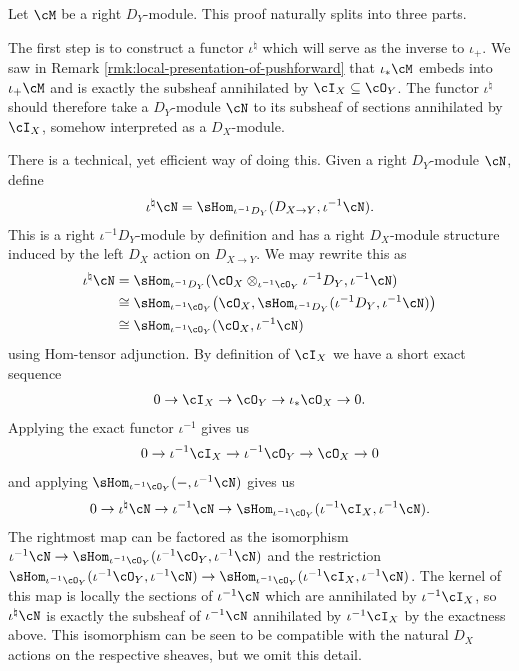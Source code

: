 \begin{prf}
	Let $\cM$ be a right $D_Y$-module. This proof naturally splits into three parts.

	The first step is to construct a functor $\iota^\natural$ which will serve as the inverse to $\iota_+$. We saw in Remark \ref{rmk:local-presentation-of-pushforward} that $\iota_*\cM$ embeds into $\iota_+\cM$ and is exactly the subsheaf annihilated by $\cI_X\subseteq \cO_Y$. The functor $\iota^\natural$ should therefore take a $D_Y$-module $\cN$ to its subsheaf of sections annihilated by $\cI_X$, somehow interpreted as a $D_X$-module.

	There is a technical, yet efficient way of doing this. Given a right $D_Y$-module $\cN$, define
	\begin{align*}
		\iota^\natural\cN = \sHom_{\iota^{-1}D_Y}(D_{X\to Y}, \iota^{-1}\cN).
	\end{align*}
	This is a right $\iota^{-1}D_Y$-module by definition and has a right $D_X$-module structure induced by the left $D_X$ action on $D_{X\to Y}$. We may rewrite this as
	\begin{align*}
		\iota^{\natural}\cN 
		  &= \sHom_{\iota^{-1}D_Y}(\cO_X\otimes_{\iota^{-1}\cO_Y}\iota^{-1}D_Y,\iota^{-1}\cN) \\
		  &\cong \sHom_{\iota^{-1}\cO_Y}\big(\cO_X,\sHom_{\iota^{-1}D_Y}(\iota^{-1}D_Y,\iota^{-1}\cN)\big) \\
		  &\cong \sHom_{\iota^{-1}\cO_Y}(\cO_X,\iota^{-1}\cN)
	\end{align*}
	using Hom-tensor adjunction. By definition of $\cI_X$ we have a short exact sequence
	\begin{align*}
		0\to \cI_X \to \cO_Y \to \iota_*\cO_X\to 0.
	\end{align*}
	Applying the exact functor $\iota^{-1}$ gives us
	\begin{align*}
		0\to \iota^{-1}\cI_X \to \iota^{-1}\cO_Y \to \cO_X \to 0
	\end{align*}
	and applying $\sHom_{\iota^{-1}\cO_Y}(-,\iota^{-1}\cN)$ gives us
	\begin{align*}
		0 \to \iota^{\natural}\cN \to \iota^{-1}\cN \to \sHom_{\iota^{-1}\cO_Y}(\iota^{-1}\cI_X,\iota^{-1}\cN).
	\end{align*}
	The rightmost map can be factored as the isomorphism $\iota^{-1}\cN \to \sHom_{\iota^{-1}\cO_Y}(\iota^{-1}\cO_Y,\iota^{-1}\cN)$ and the restriction $\sHom_{\iota^{-1}\cO_Y}(\iota^{-1}\cO_Y,\iota^{-1}\cN)\to \sHom_{\iota^{-1}\cO_Y}(\iota^{-1}\cI_X,\iota^{-1}\cN)$. The kernel of this map is locally the sections of $\iota^{-1}\cN$ which are annihilated by $\iota^{-1}\cI_X$, so $\iota^\natural \cN$ is exactly the subsheaf of $\iota^{-1}\cN$ annihilated by $\iota^{-1}\cI_X$ by the exactness above. This isomorphism can be seen to be compatible with the natural $D_X$ actions on the respective sheaves, but we omit this detail.


\end{prf}
